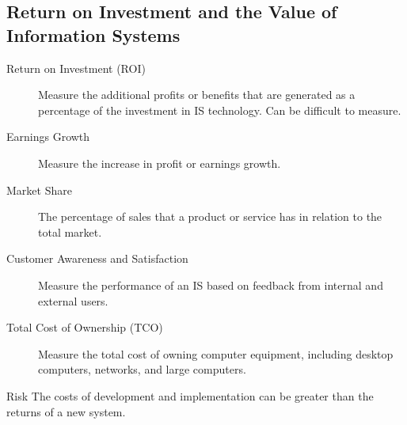 \documentclass[\main/notes.tex]{subfiles}
\begin{document}
			\subsection{Return on Investment and the Value of Information Systems}
				\begin{description}
					\item[Return on Investment (ROI)] Measure the additional profits or benefits that are generated as a percentage of the investment in IS technology. Can be difficult to measure.
					\item[Earnings Growth] Measure the increase in profit or earnings growth.
					\item[Market Share] The percentage of sales that a product or service has in relation to the total market.
					\item[Customer Awareness and Satisfaction] Measure the performance of an IS based on feedback from internal and external users.
					\item[Total Cost of Ownership (TCO)] Measure the total cost of owning computer equipment, including desktop computers, networks, and large computers.
				\end{description}
				\begin{sidenote}{Risk}
					The costs of development and implementation can be greater than the returns of a new system.
				\end{sidenote}
\end{document}
